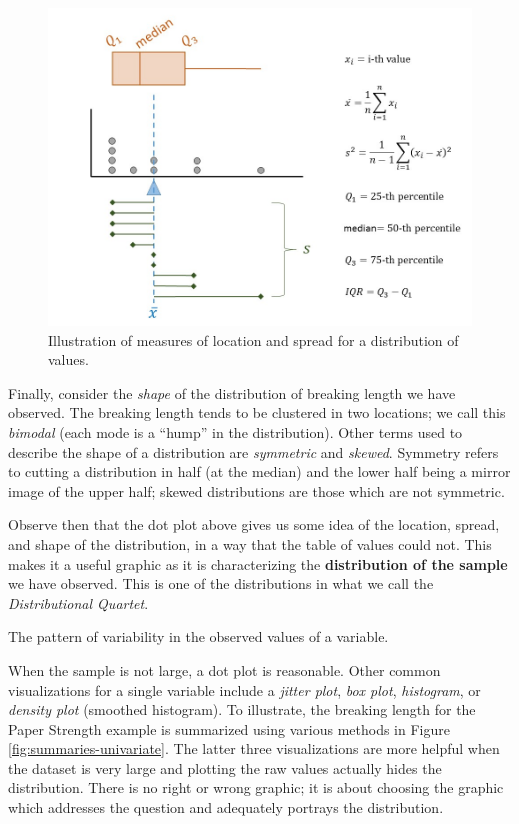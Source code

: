 \documentclass[]{book}
\theoremstyle{definition}
\theoremstyle{definition}
\theoremstyle{definition}
\theoremstyle{remark}
\let\BeginKnitrBlock\begin \let\EndKnitrBlock\end
\begin{document}
\begin{figure}

{\centering \includegraphics[width=0.8\linewidth]{./images/Summaries-Summaries} 

}

\caption{Illustration of measures of location and spread for a distribution of values.}\label{fig:summaries-summaries}
\end{figure}

Finally, consider the \emph{shape} of the distribution of breaking
length we have observed. The breaking length tends to be clustered in
two locations; we call this \emph{bimodal} (each mode is a ``hump'' in
the distribution). Other terms used to describe the shape of a
distribution are \emph{symmetric} and \emph{skewed}. Symmetry refers to
cutting a distribution in half (at the median) and the lower half being
a mirror image of the upper half; skewed distributions are those which
are not symmetric.

Observe then that the dot plot above gives us some idea of the location,
spread, and shape of the distribution, in a way that the table of values
could not. This makes it a useful graphic as it is characterizing the
\textbf{distribution of the sample} we have observed. This is one of the
distributions in what we call the \emph{Distributional Quartet}.

\BeginKnitrBlock{definition}[Distribution of the Sample]
\protect\hypertarget{def:defn-distribution-sample}{}{\label{def:defn-distribution-sample}
{} }The pattern of variability
in the observed values of a variable.
\EndKnitrBlock{definition}

When the sample is not large, a dot plot is reasonable. Other common
visualizations for a single variable include a \emph{jitter plot},
\emph{box plot}, \emph{histogram}, or \emph{density plot} (smoothed
histogram). To illustrate, the breaking length for the Paper Strength
example is summarized using various methods in Figure
\ref{fig:summaries-univariate}. The latter three visualizations are more
helpful when the dataset is very large and plotting the raw values
actually hides the distribution. There is no right or wrong graphic; it
is about choosing the graphic which addresses the question and
adequately portrays the distribution.
\end{document}
